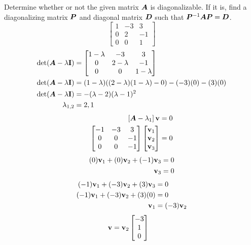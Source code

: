 \documentclass{article}
\begin{document}
Determine whether or not the given matrix $ \bm{A} $ is diagonalizable. If it is, find a diagonalizing matrix $ \bm{P} $ and diagonal matrix $ \bm{D} $ such that $ \bm{P}^{-1}\bm{A}\bm{P} = \bm{D} $.
\begin{equation*}
	\begin{bmatrix}
		1 & -3 & 3 \\
		0 & 2 & -1 \\
		0 & 0 & 1
	\end{bmatrix}
\end{equation*}
\begin{align*}
	\det( \matr{A} - \lambda \vect{I} ) & =
		\begin{bmatrix}
			1 - \lambda & -3 & 3 \\
			0 & 2 - \lambda & -1 \\
			0 & 0 & 1 - \lambda
		\end{bmatrix} \\
	\det( \matr{A} - \lambda \vect{I} ) & =
		(1 - \lambda)( (2 - \lambda)(1 - \lambda) - 0 ) - (-3)(0) - (3)(0) \\
	\det( \matr{A} - \lambda \vect{I} ) & =
		-(\lambda - 2)(\lambda - 1)^2 \\
	\lambda_{1,2} & = 2, 1
\end{align*}
\begin{align*}
	\left[ \matr{A} - \lambda_1 \right] \vect{v} & = 0 \\
	\begin{bmatrix}
		-1 & -3 & 3 \\
		0 & 0 & -1 \\
		0 & 0 & -1
	\end{bmatrix}
	\begin{bmatrix} \vect{v}_1 \\ \vect{v}_2 \\ \vect{v}_3 \end{bmatrix} & = 0
\end{align*}
\begin{align*}
	(0)\vect{v}_1 + (0)\vect{v}_2 + (-1)\vect{v}_3 & = 0 \\
	\vect{v}_3 & = 0
\end{align*}
\begin{align*}
	(-1)\vect{v}_1 + (-3)\vect{v}_2 + (3)\vect{v}_3 & = 0 \\
	(-1)\vect{v}_1 + (-3)\vect{v}_2 + (3)(0) & = 0 \\
	\vect{v}_1 & = (-3)\vect{v}_2
\end{align*}
\begin{align*}
	\vect{v} & = \vect{v}_2 \begin{bmatrix} -3 \\ 1 \\ 0 \end{bmatrix}
\end{align*}
\end{document}
